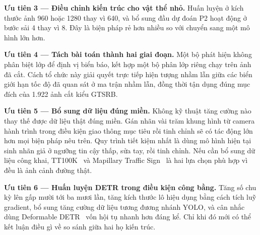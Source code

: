 \textbf{Ưu tiên 3 --- Điều chỉnh kiến trúc cho vật thể nhỏ.} Huấn luyện ở kích thước ảnh 960 hoặc
1280 thay vì 640, và bổ sung đầu dự đoán P2 hoạt động ở bước sải 4 thay vì 8. Đây là biện pháp rẻ
hơn nhiều so với chuyển sang một mô hình lớn hơn.

\textbf{Ưu tiên 4 --- Tách bài toán thành hai giai đoạn.} Một bộ phát hiện không phân biệt lớp để
định vị biển báo, kết hợp một bộ phân lớp riêng chạy trên ảnh đã cắt. Cách tổ chức này giải quyết
trực tiếp hiện tượng nhầm lẫn giữa các biển giới hạn tốc độ đã quan sát ở ma trận nhầm lẫn, đồng
thời tận dụng đúng mục đích của 1.922 ảnh cắt kiểu GTSRB.

\textbf{Ưu tiên 5 --- Bổ sung dữ liệu đúng miền.} Không kỹ thuật tăng cường nào thay thế được dữ
liệu thật đúng miền. Gán nhãn vài trăm khung hình từ camera hành trình trong điều kiện giao thông
mục tiêu rồi tinh chỉnh sẽ có tác động lớn hơn mọi biện pháp nêu trên. Quy trình tiết kiệm nhất là
dùng mô hình hiện tại sinh nhãn giả ở ngưỡng tin cậy thấp, sửa tay, rồi tinh chỉnh. Nếu cần bổ
sung dữ liệu công khai, TT100K~\cite{zhu2016tt100k} và Mapillary Traffic
Sign~\cite{ertler2020mapillary} là hai lựa chọn phù hợp vì đều là ảnh cảnh đường thật.

\textbf{Ưu tiên 6 --- Huấn luyện DETR trong điều kiện công bằng.} Tăng số chu kỳ lên gấp mười tới
ba mươi lần, tăng kích thước lô hiệu dụng bằng cách tích luỹ gradient, bổ sung tăng cường dữ liệu
tương đương nhánh YOLO, và cân nhắc dùng Deformable DETR~\cite{zhu2021deformabledetr} vốn hội tụ
nhanh hơn đáng kể. Chỉ khi đó mới có thể kết luận điều gì về so sánh giữa hai họ kiến trúc.
